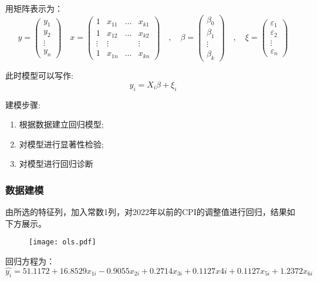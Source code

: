 \documentclass[a4paper,AutoFakeBold,AutoFakeSlant]{ctexart}
\begin{document}
用矩阵表示为：
\begin{equation}
  y=\left(\begin{array}{l}
    y_{1} \\
    y_{2} \\
    \vdots \\
    y_{n}
    \end{array}\right) \quad x=\left(\begin{array}{cccc}
    1 & x_{11} & \ldots & x_{k 1} \\
    1 & x_{12} & \ldots & x_{k 2} \\
    \vdots & \vdots & & \vdots \\
    1 & x_{1 n} & \ldots & x_{k n}
    \end{array}\right) \quad, \quad \beta=\left(\begin{array}{l}
    \beta_{0} \\
    \beta_{1} \\
    \vdots \\
    \beta_{k}
    \end{array}\right) \quad, \quad \xi=\left(\begin{array}{l}
    \varepsilon_{1} \\
    \varepsilon_{2} \\
    \vdots \\
    \varepsilon_{n}
    \end{array}\right)
\end{equation}

此时模型可以写作:
\begin{equation}
  y_i=X_i \beta+\xi_i
\end{equation}

建模步骤:
\begin{enumerate}
  \item 根据数据建立回归模型;
  \item 对模型进行显著性检验;
  \item 对模型进行回归诊断
\end{enumerate}

\subsubsection{数据建模}
由所选的特征列，加入常数1列，对2022年以前的CPI的调整值进行回归，结果如下方展示。
\begin{figure}[htbp]
  \centering
  \texttt{[image: ols.pdf]}
  \label{f15}
\end{figure}
回归方程为：
\begin{equation*}
  \hat{y_i} = 51.1172 + 16.8529x_{1i} -0.9055x_{2i} + 0.2714x_{3i} + 0.1127x{4i} + 0.1127x_{5i} + 1.2372x_{6i}
\end{equation*}
\end{document}
